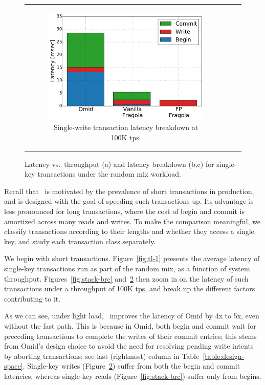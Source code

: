 \begin{figure}[t!]
\begin{tabular}{ccc}
      \begin{subfigure}[t]{0.31\textwidth}
	    \includegraphics[width=\textwidth]{figs/latency_Put.pdf}
        \caption[]{Single-write transaction latency breakdown at 100K tps.}
        \label{fig:stack-bwc}
      \end{subfigure}

\end{tabular}
       \caption{Latency vs.\ throughput (a) and latency breakdown (b,c) for single-key transactions under the random mix workload. }
\end{figure}


Recall that \sys\ is motivated by the prevalence of short transactions in production, and is designed with
the goal of speeding such transactions up.
Its advantage is less pronounced for long transactions, where the cost of begin and commit is amortized
across many reads and writes.
To make the comparison meaningful, we classify transactions according to their lengths and whether they
access a single key, and study each transaction class separately. 

We begin with short transactions. 
Figure~\ref{fig:tl-1} presents the average latency of single-key transactions run as part of the random mix,
as a function of {system} throughput.
Figures~\ref{fig:stack-brc} and~\ref{fig:stack-bwc} then zoom in on the latency of such transactions under a throughput of 100K tps,
and break up the different factors contributing to it. 

As we can see, under light load, \sys\ improves the latency of Omid by 4x to 5x, even without the fast path.
This is because in Omid, both begin and commit wait for preceding transactions to complete the writes of 
their commit entries; this stems from Omid's design choice to avoid the need for resolving pending write intents
by aborting transactions; see last (rightmost) column in Table~\ref{table:design-space}. 
Single-key writes (Figure~\ref{fig:stack-bwc})
suffer from both the begin and commit latencies, whereas single-key reads (Figure~\ref{fig:stack-brc}) 
suffer only from begins. 

